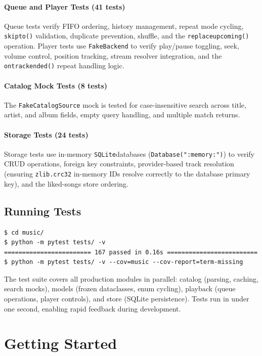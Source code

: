 \documentclass[a4paper,11pt,twoside]{article}
\newcommand{\sqlite}{\texttt{SQLite}}
\DeclareRobustCommand{\method}[1]{\texttt{\def\_{\textunderscore\allowbreak}#1}}
\begin{document}
\paragraph{Queue and Player Tests (41 tests)}
Queue tests verify FIFO ordering, history management, repeat mode cycling,
\method{skip\_to()} validation, duplicate prevention, shuffle, and the
\method{replace\_upcoming()} operation. Player tests use \texttt{FakeBackend}
to verify play/pause toggling, seek, volume control, position tracking,
stream resolver integration, and the \method{on\_track\_ended()} repeat
handling logic.

\paragraph{Catalog Mock Tests (8 tests)}
The \texttt{FakeCatalogSource} mock is tested for case-insensitive search
across title, artist, and album fields, empty query handling, and multiple
match returns.

\paragraph{Storage Tests (24 tests)}
Storage tests use in-memory \sqlite databases (\texttt{Database(":memory:")})
to verify CRUD operations, foreign key constraints, provider-based track
resolution (ensuring \texttt{zlib.crc32} in-memory IDs resolve correctly to
the database primary key), and the liked-songs store ordering.

\subsection{Running Tests}

\begin{lstlisting}[style=console, caption={Running the test suite.}]
$ cd music/
$ python -m pytest tests/ -v
======================== 167 passed in 0.16s =========================
$ python -m pytest tests/ -v --cov=music --cov-report=term-missing
\end{lstlisting}

The test suite covers all production modules in parallel: catalog (parsing,
caching, search mocks), models (frozen dataclasses, enum cycling), playback
(queue operations, player controls), and store (SQLite persistence). Tests
run in under one second, enabling rapid feedback during development.

\section{Getting Started}
\end{document}
